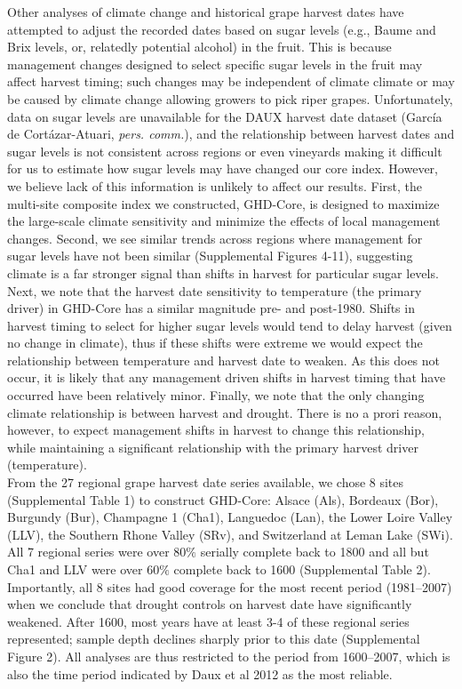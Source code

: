 \documentclass[final]{nature}
\begin{document}
\begin{methods}
\indent Other analyses of climate change and historical grape harvest dates have attempted to adjust the recorded dates based on sugar levels (e.g., Baume and Brix levels, or, relatedly potential alcohol) in the fruit\cite{webb2012}. This is because management changes designed to select specific sugar levels in the fruit may affect harvest timing; such changes may be independent of climate climate or may be caused by climate change allowing growers to pick riper grapes\cite{vanLeeuwen2016}. Unfortunately, data on sugar levels are unavailable for the DAUX harvest date dataset (Garc\'ia de Cort\'azar-Atuari, \emph{pers. comm.}), and the relationship between harvest dates and sugar levels is not consistent across regions or even vineyards\cite{Cortazar-Atauri:2010um} making it difficult for us to estimate how sugar levels may have changed our core index. However, we believe lack of this information is unlikely to affect our results. First, the multi-site composite index we constructed, GHD-Core, is designed to maximize the large-scale climate sensitivity and minimize the effects of local management changes. Second, we see similar trends across regions where management for sugar levels have not been similar (Supplemental Figures 4-11), suggesting climate is a far stronger signal than shifts in harvest for particular sugar levels. Next, we note that the harvest date sensitivity to temperature (the primary driver) in GHD-Core has a similar magnitude pre- and post-1980. Shifts in harvest timing to select for higher sugar levels would tend to delay harvest (given no change in climate), thus if these shifts were extreme we would expect the relationship between temperature and harvest date to weaken. As this does not occur, it is likely that any management driven shifts in harvest timing that have occurred have been relatively minor. Finally, we note that the only changing climate relationship is between harvest and drought. There is no a prori reason, however, to expect management shifts in harvest to change this relationship, while maintaining a significant relationship with the primary harvest driver (temperature).\\
\indent From the 27 regional grape harvest date series available, we chose 8 sites (Supplemental Table 1) to construct GHD-Core: Alsace (Als), Bordeaux (Bor), Burgundy (Bur), Champagne 1 (Cha1), Languedoc (Lan), the Lower Loire Valley (LLV), the Southern Rhone Valley (SRv), and Switzerland at Leman Lake (SWi). All 7 regional series were over $80\%$ serially complete back to 1800 and all but Cha1 and LLV were over $60\%$ complete back to 1600 (Supplemental Table 2). Importantly, all 8 sites had good coverage for the most recent period (1981--2007) when we conclude that drought controls on harvest date have significantly weakened. After 1600, most years have at least 3-4 of these regional series represented; sample depth declines sharply prior to this date (Supplemental Figure 2). All analyses are thus restricted to the period from 1600--2007, which is also the time period indicated by Daux et al 2012 as the most reliable.\\

\end{methods}
\end{document}
